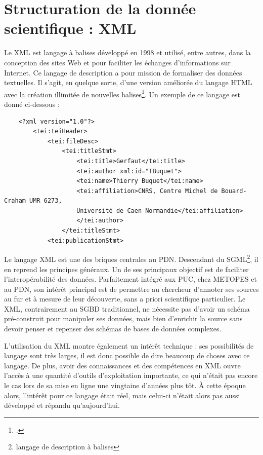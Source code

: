 \documentclass[a4paper,12pt,twoside]{book}
\begin{document}
    \section{Structuration de la donnée scientifique : XML}
    
    Le \acrfull{XML} est langage à balises développé en  1998 et utilisé, entre autres, dans la conception des sites Web et pour faciliter les échanges d'informations sur Internet. Ce langage de description a pour mission de formaliser des données textuelles. Il s'agit, en quelque sorte, d'une version améliorée du langage HTML avec la création illimitée de nouvelles balises\footcite{def-xml}. Un exemple de ce langage est donné ci-dessous :
    
    \begin{verbatim}
    <?xml version="1.0"?>
        <tei:teiHeader>
            <tei:fileDesc>
                <tei:titleStmt>
                    <tei:title>Gerfaut</tei:title>
                    <tei:author xml:id="TBuquet">
                    <tei:name>Thierry Buquet</tei:name>
                    <tei:affiliation>CNRS, Centre Michel de Bouard-Craham UMR 6273,
                    Université de Caen Normandie</tei:affiliation>
                    </tei:author>
                </tei:titleStmt>
            <tei:publicationStmt>
    \end{verbatim}
    
    Le langage \acrshort{XML} est une des briques centrales au \acrshort{PDN}. Descendant du \acrfull{SGML}\footnote{langage de description à balises}, il en reprend les principes généraux. Un de ses principaux objectif est de faciliter l'interopérabilité des données. Parfaitement intégré aux \acrshort{PUC}, chez \acrshort{METOPES} et au \acrshort{PDN}, son intérêt principal est de permettre au chercheur d'annoter ses sources au fur et à mesure de leur découverte, sans a priori scientifique particulier. Le \acrshort{XML}, contrairement au \acrfull{SGBD} traditionnel, ne nécessite pas d'avoir un schéma pré-construit pour manipuler ses données, mais bien d'enrichir la source sans devoir penser et repenser des schémas de bases de données complexes.
    
    L'utilisation du \acrshort{XML} montre également un intérêt technique : ses possibilités de langage sont très larges, il est donc possible de dire beaucoup de choses avec ce langage. De plus, avoir des connaissances et des compétences en XML ouvre l'accès à une quantité d'outils d'exploitation importante, ce qui n'était pas encore le cas lors de sa mise en ligne une vingtaine d'années plus tôt. À cette époque alors, l'intérêt pour ce langage était réel, mais celui-ci n'était alors pas aussi développé et répandu qu'aujourd'hui.
    
\end{document}
